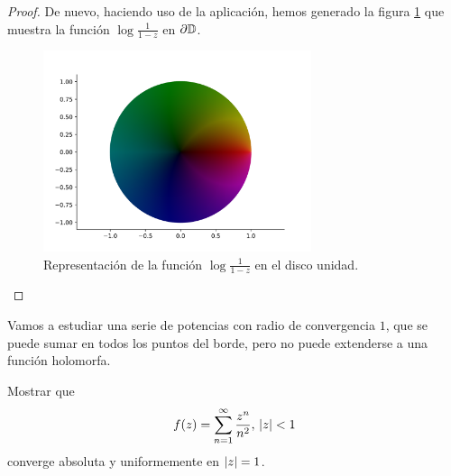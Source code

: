 \begin{proof}
    De nuevo, haciendo uso de la aplicación, hemos generado la figura  \ref{fig:ejemplo2} que muestra la función $\log{\frac{1}{1 - z}}$ en $\partial \mathbb{D}$. \\

\begin{figure}[!htbp]
    \centering
    \includegraphics[width=0.7\textwidth]{../Aplicacion/log(1:(1-z)).png}
    \caption{Representación de la función $\log{\frac{1}{1 - z}}$ en el disco unidad.}
    \label{fig:ejemplo2}
\end{figure}
\end{proof}


Vamos a estudiar una serie de potencias con radio de convergencia $1$, que se puede sumar en todos los puntos del borde, pero no puede extenderse a una función holomorfa. \\

\begin{example}
    Mostrar que
    \begin{equation*}
        f(z) = \sum_{n=1}^{\infty} \frac{z^n}{n^2}, \, \left\lvert z\right\rvert < 1
    \end{equation*}
    converge absoluta y uniformemente en $\left\lvert z\right\rvert = 1$.
\end{example}

